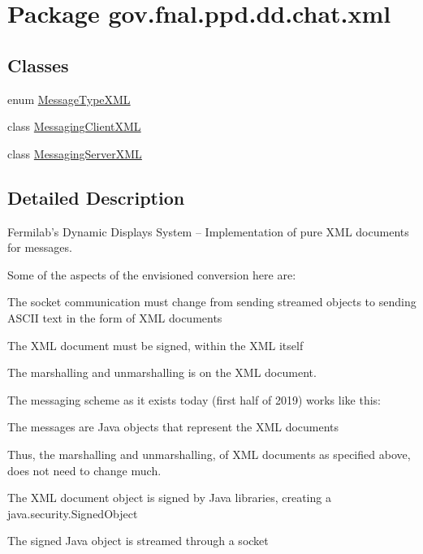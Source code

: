 \hypertarget{namespacegov_1_1fnal_1_1ppd_1_1dd_1_1chat_1_1xml}{\section{Package gov.\-fnal.\-ppd.\-dd.\-chat.\-xml}
\label{namespacegov_1_1fnal_1_1ppd_1_1dd_1_1chat_1_1xml}
}
\subsection*{Classes}
\begin{DoxyCompactItemize}
\item 
enum \hyperlink{enumgov_1_1fnal_1_1ppd_1_1dd_1_1chat_1_1xml_1_1MessageTypeXML}{Message\-Type\-X\-M\-L}
\item 
class \hyperlink{classgov_1_1fnal_1_1ppd_1_1dd_1_1chat_1_1xml_1_1MessagingClientXML}{Messaging\-Client\-X\-M\-L}
\item 
class \hyperlink{classgov_1_1fnal_1_1ppd_1_1dd_1_1chat_1_1xml_1_1MessagingServerXML}{Messaging\-Server\-X\-M\-L}
\end{DoxyCompactItemize}


\subsection{Detailed Description}
Fermilab's Dynamic Displays System -- Implementation of pure X\-M\-L documents for messages. 

Some of the aspects of the envisioned conversion here are\-: 
\begin{DoxyEnumerate}
\item The socket communication must change from sending streamed objects to sending A\-S\-C\-I\-I text in the form of X\-M\-L documents 
\item The X\-M\-L document must be signed, within the X\-M\-L itself 
\item The marshalling and unmarshalling is on the X\-M\-L document. 
\end{DoxyEnumerate}

The messaging scheme as it exists today (first half of 2019) works like this\-: 
\begin{DoxyItemize}
\item The messages are Java objects that represent the X\-M\-L documents 
\begin{DoxyItemize}
\item Thus, the marshalling and unmarshalling, of X\-M\-L documents as specified above, does not need to change much. 
\end{DoxyItemize}
\item The X\-M\-L document object is signed by Java libraries, creating a java.\-security.\-Signed\-Object 
\item The signed Java object is streamed through a socket 
\end{DoxyItemize}

